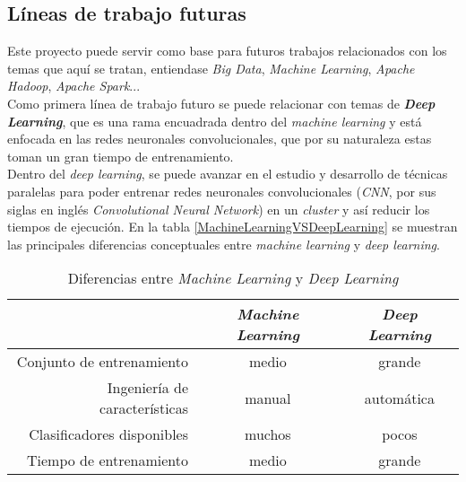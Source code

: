 \clearpage

\subsection*{Líneas de trabajo futuras}
Este proyecto puede servir como base para futuros trabajos relacionados con los temas que aquí se tratan, 
entiendase \textit{Big Data}, \textit{Machine Learning}, \textit{Apache Hadoop}, \textit{Apache Spark}...\\
Como primera línea de trabajo futuro se puede relacionar con temas de \textbf{\textit{Deep Learning}}, que es una rama encuadrada dentro del \textit{machine learning} 
y está enfocada en las redes neuronales convolucionales, que por su naturaleza estas toman un gran 
tiempo de entrenamiento.\\
Dentro del \textit{deep learning}, se puede avanzar en el estudio y desarrollo de técnicas paralelas para poder
entrenar redes neuronales convolucionales (\textit{CNN}, por sus siglas en inglés \textit{Convolutional Neural Network}) 
en un \textit{cluster} y así reducir los tiempos de ejecución.
En la tabla \autoref{MachineLearningVSDeepLearning} se muestran las principales diferencias conceptuales
entre \textit{machine learning} y \textit{deep learning}.

\begin{table}[!htpb]
  \centering
  \begin{tabular}{|r|c|c|} %
    \hline
    & \textbf{\textit{Machine Learning}} & \textbf{\textit{Deep Learning}} \\ \hline
    Conjunto de entrenamiento & medio & grande \\ \hline
    Ingeniería de características & manual & automática \\ \hline
    Clasificadores disponibles & muchos & pocos \\ \hline
    Tiempo de entrenamiento & medio & grande \\ \hline
  \end{tabular}
   \caption[Diferencias entre \textit{Machine Learning} y \textit{Deep Learning}]
           {Diferencias entre \textit{Machine Learning} y \textit{Deep Learning}}
   \label{MachineLearningVSDeepLearning}
\end{table}

